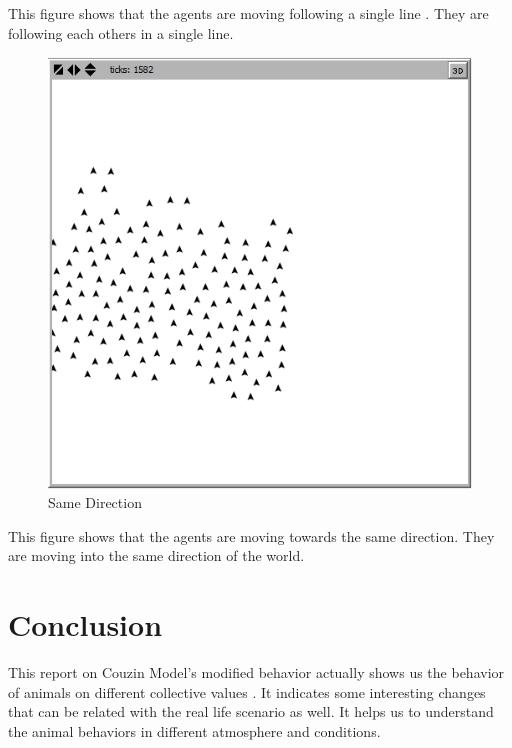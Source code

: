 \documentclass{article}
\begin{document}
This figure shows that the agents are moving following a single line . They are following each others in a single line.


\begin{figure}[H]
  \includegraphics[width=\linewidth]{same.png}
  \caption{Same Direction}
 
\end{figure}

This figure shows that the agents are moving towards the same direction. They are moving into the same direction of the world.


\section{Conclusion}
This report on Couzin Model's modified behavior actually shows us the behavior of animals on different collective values . It indicates some interesting changes that can be related with the real life scenario as well. It helps us to understand the animal behaviors in different atmosphere and conditions. 
\end{document}
